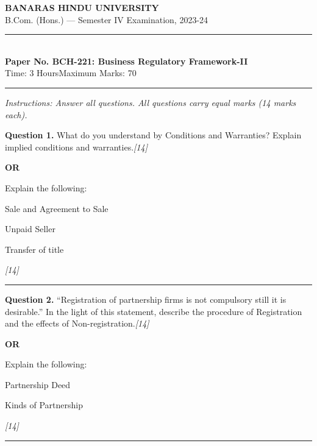 \documentclass[11pt,a4paper]{article}
\newcommand{\pts}[1]{\hfill   \textit{[#1]}}
\begin{document}
\begin{center}
  {\large\bfseries BANARAS HINDU UNIVERSITY}\\[2pt]
  {\normalsize B.Com. (Hons.) --- Semester IV Examination, 2023-24}\\[6pt]
  \rule{0.8\linewidth}{0.5pt}\\[6pt]
  {\large\bfseries Paper No. BCH-221: Business Regulatory Framework-II}\\[4pt]
  {\normalsize Time: 3 Hours\hfill Maximum Marks: 70}
\end{center}

\rule{\linewidth}{0.4pt}

\smallskip



\noindent   \textit{Instructions: Answer all questions. All questions carry equal marks (14 marks each).}

\bigskip




\noindent   \textbf{Question 1.}
What do you understand by Conditions and Warranties? Explain implied conditions and warranties.\pts{14}

\centerline{   \textbf{OR}}

Explain the following:

\begin{parts}
  \item Sale and Agreement to Sale
  \item Unpaid Seller
  \item Transfer of title
\end{parts}\pts{14}

\medskip\rule{\linewidth}{0.2pt}




\noindent   \textbf{Question 2.}
``Registration of partnership firms is not compulsory still it is desirable.'' In the light of this statement, describe the procedure of Registration and the effects of Non-registration.\pts{14}

\centerline{   \textbf{OR}}

Explain the following:

\begin{parts}
  \item Partnership Deed
  \item Kinds of Partnership
\end{parts}\pts{14}

\medskip\rule{\linewidth}{0.2pt}
\end{document}
